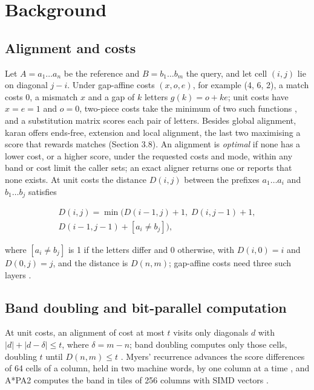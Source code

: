 \section{Background}

\subsection{Alignment and costs}

Let \(A=a_1\dots a_n\) be the reference and \(B=b_1\dots b_m\) the query, and let cell \((i,j)\) lie on diagonal \(j-i\). Under gap-affine costs \((x, o, e)\), for example (4, 6, 2), a match costs 0, a mismatch \(x\) and a gap of \(k\) letters \(g(k)=o+ke\); unit costs have \(x=e=1\) and \(o=0\), two-piece costs take the minimum of two such functions \citep{Li2018minimap2}, and a substitution matrix scores each pair of letters. Besides global alignment, karan offers ends-free, extension \citep{Li2018minimap2} and local alignment, the last two maximising a score that rewards matches (Section 3.8). An alignment is \emph{optimal} if none has a lower cost, or a higher score, under the requested costs and mode, within any band or cost limit the caller sets; an exact aligner returns one or reports that none exists. At unit costs the distance \(D(i,j)\) between the prefixes \(a_1\dots a_i\) and \(b_1\dots b_j\) satisfies

\begin{equation}\begin{gathered}
D(i,j) = \min\bigl(D(i-1,j)+1,\; D(i,j-1)+1,\\ D(i-1,j-1)+[a_i \ne b_j]\bigr),
\end{gathered}\end{equation}

where \([a_i \ne b_j]\) is 1 if the letters differ and 0 otherwise, with \(D(i,0)=i\) and \(D(0,j)=j\), and the distance is \(D(n,m)\); gap-affine costs need three such layers \citep{Gotoh1982}.

\subsection{Band doubling and bit-parallel computation}

At unit costs, an alignment of cost at most \(t\) visits only diagonals \(d\) with \(|d| + |d - \delta| \le t\), where \(\delta = m - n\); band doubling computes only those cells, doubling \(t\) until \(D(n,m) \le t\) \citep{Ukkonen1985}. Myers' recurrence advances the score differences of 64 cells of a column, held in two machine words, by one column at a time \citep{Myers1999bitvector}, and A*PA2 computes the band in tiles of 256 columns with SIMD vectors \citep{GrootKoerkamp2024astarpa2}.

